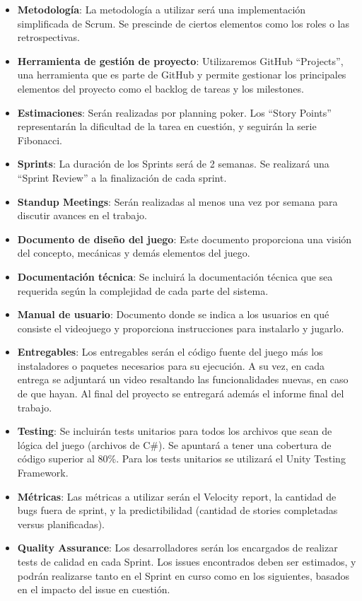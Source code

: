 \documentclass[a4paper]{article}
\begin{document}
\begin{itemize}
    \item \textbf{Metodología}: La metodología a utilizar será una implementación simplificada de Scrum. Se prescinde de ciertos elementos como los roles o las retrospectivas.
    \item \textbf{Herramienta de gestión de proyecto}: Utilizaremos GitHub “Projects”, una herramienta que es parte de GitHub y permite gestionar los principales elementos del proyecto como el backlog de tareas y los milestones.
    \item \textbf{Estimaciones}: Serán realizadas por planning poker. Los “Story Points” representarán la dificultad de la tarea en cuestión, y seguirán la serie Fibonacci.
    \item \textbf{Sprints}: La duración de los Sprints será de 2 semanas. Se realizará una “Sprint Review” a la finalización de cada sprint.
    \item \textbf{Standup Meetings}: Serán realizadas al menos una vez por semana para discutir avances en el trabajo.
    \item \textbf{Documento de diseño del juego}: Este documento proporciona una visión del concepto, mecánicas y demás elementos del juego.
    \item \textbf{Documentación técnica}: Se incluirá la documentación técnica que sea requerida según la complejidad de cada parte del sistema.
    \item \textbf{Manual de usuario}: Documento donde se indica a los usuarios en qué consiste el videojuego y proporciona instrucciones para instalarlo y jugarlo.
    \item \textbf{Entregables}: Los entregables serán el código fuente del juego más los instaladores o paquetes necesarios para su ejecución. A su vez, en cada entrega se adjuntará un video resaltando las funcionalidades nuevas, en caso de que hayan. Al final del proyecto se entregará además el informe final del trabajo.
    \item \textbf{Testing}: Se incluirán tests unitarios para todos los archivos que sean de lógica del juego (archivos de C\#). Se apuntará a tener una cobertura de código superior al 80\%. Para los tests unitarios se utilizará el Unity Testing Framework.
    \item \textbf{Métricas}: Las métricas a utilizar serán el Velocity report, la cantidad de bugs fuera de sprint, y la predictibilidad (cantidad de stories completadas versus planificadas).
    \item \textbf{Quality Assurance}: Los desarrolladores serán los encargados de realizar tests de calidad en cada Sprint. Los issues encontrados deben ser estimados, y podrán realizarse tanto en el Sprint en curso como en los siguientes, basados en el impacto del issue en cuestión.
\end{itemize}



\end{document}
